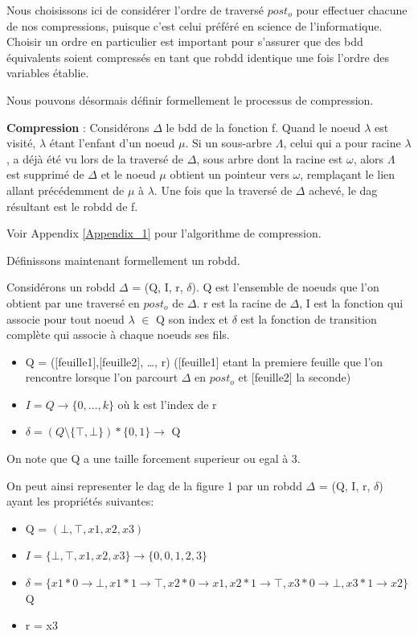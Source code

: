 \documentclass[french]{article}
\begin{document}
Nous choisissons ici de considérer l'ordre de traversé \(post_{o}\) pour effectuer chacune de nos compressions, puisque c'est celui préféré en science de l'informatique. Choisir un ordre en particulier est important pour s'assurer que des bdd équivalents soient compressés en tant que robdd identique une fois l'ordre des variables établie.
\vspace{5mm} %

Nous pouvons désormais définir formellement le processus de compression.

\textbf{Compression} :  Considérons \(\Delta\) le bdd de la fonction f.  Quand le noeud \(\lambda\) est visité, \(\lambda\) étant l'enfant d'un noeud \(\mu\). Si un sous-arbre \(\Lambda\), celui qui a pour racine \(\lambda\), a déjà été vu lors de la traversé de \(\Delta\), sous arbre dont la racine est \(\omega\), alors \(\Lambda\) est supprimé de \(\Delta\) et le noeud \(\mu\) obtient un pointeur vers \(\omega\), remplaçant le lien allant précédemment de \(\mu\) à \(\lambda\). Une fois que la traversé de \(\Delta\) achevé, le dag résultant est le robdd de f.

Voir Appendix \ref{Appendix_1} pour l'algorithme de compression.
\vspace{5mm} %

Définissons maintenant formellement un robdd.

Considérons un robdd \(\Delta\) = (Q, I, r, \(\delta\)). Q est l'ensemble de noeuds que l'on obtient par une traversé en \(post_{o}\) de \(\Delta\). r est la racine de \(\Delta\), I est la fonction qui associe pour tout noeud \(\lambda\) \(\in\) Q son index et \(\delta\) est la fonction de transition complète qui associe à chaque noeuds ses fils.
\begin{itemize}
    \item
    	Q  =   ([feuille1],[feuille2], …, r)
    	([feuille1] etant la premiere feuille que l'on rencontre lorsque l'on parcourt \(\Delta\) en \(post_{o}\) et [feuille2] la seconde)
    \item 
        \(I = Q   \rightarrow  \{0, \ldots , k\}\) où k est l'index de r
    \item 
       \( \delta = (Q \setminus  \{\top,  \bot\}) * \{0, 1\} \rightarrow \) Q
\end{itemize}

On note que Q a une taille forcement superieur ou egal à 3.

On peut ainsi representer le dag de la figure 1 par un robdd \(\Delta\) = (Q, I, r, \(\delta\)) ayant les propriétés suivantes:
\begin{itemize}
    \item
    	Q  =   \((\bot, \top, x1,x2,x3)\)
    \item 
        \(I = \{\bot, \top, x1,x2,x3\}   \rightarrow  \{0,0,1,2,3\}\)
    \item 
       \( \delta = \{ x1 * 0 \rightarrow \bot , x1 * 1 \rightarrow \top, x2 * 0 \rightarrow x1, x2 * 1 \rightarrow \top, x3 * 0 \rightarrow \bot, x3 * 1 \rightarrow x2 \} \) Q
    \item 
        r = x3
\end{itemize}
\end{document}
